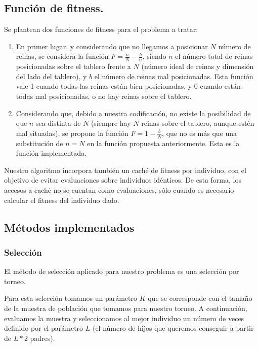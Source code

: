 \documentclass[12pt]{article}
\begin{document}
\subsection{Función de fitness.}

Se plantean dos funciones de fitness para el problema a tratar:

\begin{enumerate}
    \item En primer lugar, y considerando que no llegamos a posicionar $N$ número de reinas, se considera la función $F=\frac{n}{N} - \frac{b}{n}$, siendo $n$ el número total de reinas posicionadas sobre el tablero frente a $N$ (número ideal de reinas y dimensión del lado del tablero), y $b$ el número de reinas mal posicionadas. Esta función vale 1 cuando todas las reinas están bien posicionadas, y 0 cuando están todas mal posicionadas, o no hay reinas sobre el tablero.
    \item Considerando que, debido a nuestra codificación, no existe la posibilidad de que $n$ sea distinta de $N$ (siempre hay $N$ reinas sobre el tablero, aunque estén mal situadas), se propone la función $F=1-\frac{b}{N}$, que no es más que una substitución de $n=N$ en la función propuesta anteriormente. Esta es la función implementada.
\end{enumerate}

Nuestro algoritmo incorpora también un caché de fitness por individuo, con el objetivo de evitar evaluaciones sobre individuos idénticos. De esta forma, los accesos a caché no se cuentan como evaluaciones, sólo cuando es necesario calcular el fitness del individuo dado.

\subsection{Métodos implementados}

\subsubsection{Selección}

El método de selección aplicado para nuestro problema es una selección por torneo.

Para esta selección tomamos un parámetro $K$ que se corresponde con el tamaño de la muestra de población que tomamos para nuestro torneo. A continuación, evaluamos la muestra y seleccionamos al mejor individuo un número de veces definido por el parámetro $L$ (el número de hijos que queremos conseguir a partir de $L*2$ padres).
\end{document}
